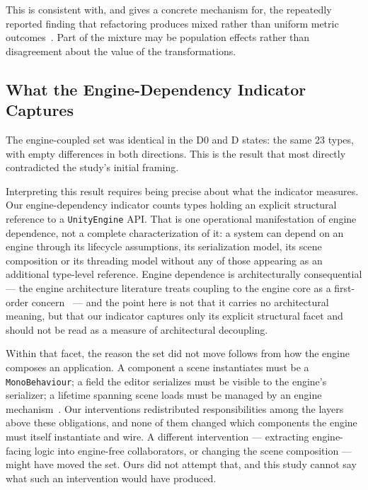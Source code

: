 \documentclass{sbc2019}%
\begin{document}
This is consistent with, and gives a concrete mechanism for, the repeatedly
reported finding that refactoring produces mixed rather than uniform metric
outcomes~\cite{szoke2017,bavota2015,palomba2018}. Part of the mixture may be
population effects rather than disagreement about the value of the
transformations.

\subsection{What the Engine-Dependency Indicator Captures}

The engine-coupled set was identical in the D0 and D states: the same 23 types, with empty
differences in both directions. This is the result that most directly
contradicted the study's initial framing.

Interpreting this result requires being precise about what the indicator
measures. Our engine-dependency indicator counts types holding an explicit
structural reference to a \texttt{UnityEngine} API\@. That is one operational
manifestation of engine dependence, not a complete characterization of it: a
system can depend on an engine through its lifecycle assumptions, its
serialization model, its scene composition or its threading model without any of
those appearing as an additional type-level reference. Engine dependence is
architecturally consequential --- the engine architecture literature treats
coupling to the engine core as a first-order concern~\cite{politowski2025,ullmann2023} --- and the point here is not that it carries
no architectural meaning, but that our indicator captures only its explicit
structural facet and should not be read as a measure of architectural decoupling.

Within that facet, the reason the set did not move follows from how the engine
composes an application. A component a scene instantiates must be a
\texttt{MonoBehaviour}; a field the editor serializes must be visible to the
engine's serializer; a lifetime spanning scene loads must be managed by an engine
mechanism~\cite{unitydocs}. Our interventions redistributed responsibilities
among the layers above these obligations, and none of them changed which
components the engine must itself instantiate and wire. A different intervention
--- extracting engine-facing logic into engine-free collaborators, or changing the
scene composition --- might have moved the set. Ours did not attempt that, and
this study cannot say what such an intervention would have produced.
\end{document}
